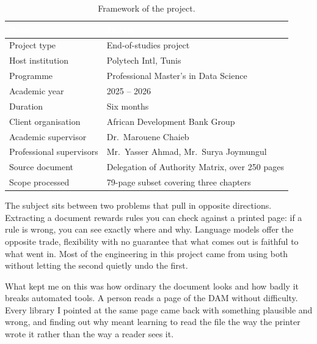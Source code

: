 \begin{table}[h]
\centering
\caption{Framework of the project.}
\label{tab:framework}
\begin{tabular}{|p{}|p{}|}
\hline
\rowcolor{myblue}\textcolor{white}{\textbf{Item}} & \textcolor{white}{\textbf{Detail}} \\
\hline
Project type & End-of-studies project \\ \hline
Host institution & Polytech Intl, Tunis \\ \hline
Programme & Professional Master's in Data Science \\ \hline
Academic year & 2025 -- 2026 \\ \hline
Duration & Six months \\ \hline
Client organisation & African Development Bank Group \\ \hline
Academic supervisor & Dr.~Marouene Chaieb \\ \hline
Professional supervisors & Mr.~Yasser Ahmad, Mr.~Surya Joymungul \\ \hline
Source document & Delegation of Authority Matrix, over 250 pages \\ \hline
Scope processed & 79-page subset covering three chapters \\ \hline
\end{tabular}
\end{table}

The subject sits between two problems that pull in opposite directions.
Extracting a document rewards rules you can check against a printed page: if a
rule is wrong, you can see exactly where and why. Language models offer the
opposite trade, flexibility with no guarantee that what comes out is faithful to
what went in. Most of the engineering in this project came from using both
without letting the second quietly undo the first.

 What kept me on this was how ordinary the document looks and how badly it breaks automated tools. A person reads a page of the DAM without difficulty. Every library I pointed at the same page came back with something plausible and wrong, and finding out why meant learning to read the file the way the printer wrote it rather than the way a reader sees it.


